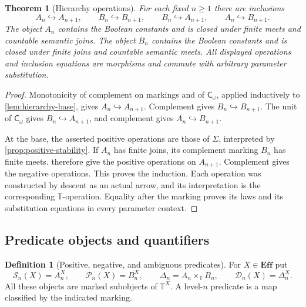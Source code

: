 \documentclass[11pt,a4paper]{article}
\numberwithin{equation}{section}
\newtheorem{theorem}{Theorem}[section]
\theoremstyle{definition}
\newtheorem{definition}[definition]{Definition}
\theoremstyle{remark}
\theoremstyle{plain}
\newcommand{\E}{\mathbf{Eff}}
\newcommand{\TV}{\mathbb T}
\newcommand{\incl}{\hookrightarrow}
\newcommand{\Cw}{\mathsf C_{\omega}}
\newcommand{\SSn}{\mathcal S}
\newcommand{\PPn}{\mathcal P}
\newcommand{\DDn}{\mathcal D}
\begin{document}
\begin{theorem}[Hierarchy operations]
\label{thm:hierarchy-operations}
For each fixed $n\geq1$ there are inclusions
\[
 A_n\incl A_{n+1},\qquad B_n\incl B_{n+1},\qquad
 B_n\incl A_{n+1},\qquad A_n\incl B_{n+1}.
\]
The object $A_n$ contains the Boolean constants and is closed under
finite meets and countable semantic joins. The object $B_n$ contains
the Boolean constants and is closed under finite joins and countable
semantic meets. All displayed operations and inclusion equations are
morphisms and commute with arbitrary parameter substitution.
\end{theorem}
\begin{proof}
Monotonicity of complement on markings and of $\Cw$, applied
inductively to \cref{lem:hierarchy-base}, gives $A_n\incl A_{n+1}$.
Complement gives $B_n\incl B_{n+1}$. The unit of $\Cw$ gives
$B_n\incl A_{n+1}$, and complement gives $A_n\incl B_{n+1}$.

At the base, the asserted positive operations are those of $\Sigma$,
interpreted by \cref{prop:positive-stability}. If $A_n$ has finite
joins, its complement marking $B_n$ has finite meets.
therefore give the positive operations on $A_{n+1}$. Complement gives
the negative operations. This proves the induction. Each operation was
constructed by descent as an actual arrow, and its interpretation is
the corresponding $\TV$-operation. Equality after the marking proves
its laws and its substitution equations in every parameter context.
\end{proof}

\subsection{Predicate objects and quantifiers}

\begin{definition}[Positive, negative, and ambiguous predicates]
\label{def:predicate-levels}
For $X\in\E$ put
\[
 \SSn_n(X)=A_n^X,\qquad \PPn_n(X)=B_n^X,
 \qquad \Delta_n=A_n\times_{\TV}B_n,
 \qquad \DDn_n(X)=\Delta_n^X.
\]
All these objects are marked subobjects of $\TV^X$. A level-$n$
predicate is a map classified by the indicated marking.
\end{definition}
\end{document}
